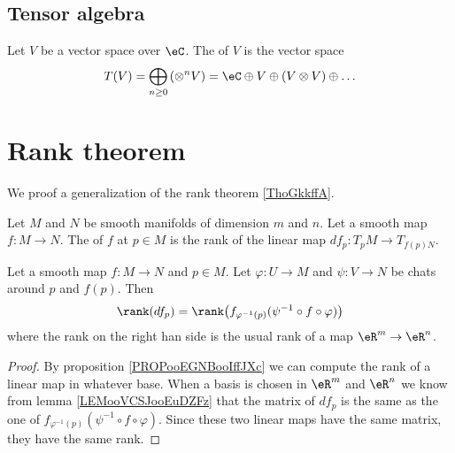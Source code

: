 \subsection{Tensor algebra}

\begin{definition}      \label{DEFooHPQXooETvEyn}
	Let \( V\) be a vector space over \( \eC\). The  of \( V\) is the vector space
	\begin{equation}
		T(V)=\bigoplus_{n\geq 0}\left(\otimes^nV\right)=\eC\oplus V\oplus(V\otimes V)\oplus\ldots
	\end{equation}
\end{definition}


\section{Rank theorem}

We proof a generalization of the rank theorem \ref{ThoGkkffA}.

\begin{definition}
	Let \( M\) and \( N\) be smooth manifolds of dimension \( m\) and \( n\). Let a smooth map \( f\colon M\to N\). The  of \( f\) at \( p\in M\) is the rank of the linear map \( df_p\colon T_pM\to T_{f(p)N}\).
\end{definition}

\begin{lemma}
	Let a smooth map \( f\colon M\to N\) and \( p\in M\). Let \( \varphi\colon U\to M\) and \( \psi\colon V\to N\) be chats around \( p\) and \( f(p)\). Then
	\begin{equation}
		\rank(df_p)=\rank\big( f_{\varphi^{-1}(p)}(\psi^{-1}\circ f\circ \varphi) \big)
	\end{equation}
	where the rank on the right han side is the usual rank of a map \( \eR^m\to \eR^n\).
\end{lemma}

\begin{proof}
	By proposition \ref{PROPooEGNBooIffJXc} we can compute the rank of a linear map in whatever base. When a basis is chosen in \( \eR^m\) and \( \eR^n\) we know from lemma \ref{LEMooVCSJooEuDZFz} that the matrix of \( df_p\) is the same as the one of \(  f_{\varphi^{-1}(p)}(\psi^{-1}\circ f\circ \varphi) \). Since these two linear maps have the same matrix, they have the same rank.
\end{proof}

